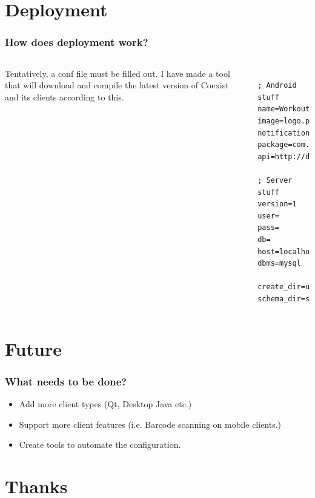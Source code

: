 \documentclass[]{beamer}
\begin{document}
\section{Deployment}

\begin{frame}[fragile]
\frametitle{How does deployment work?}

\begin{columns}[c]
\column{1.6in}
Tentatively, a conf file must be filled out. I have made a tool that will download and compile the latest version of Coexist and its clients according to this.
\column{2.5in}
\begin{lstlisting}

; Android stuff
name=Workoutlog
image=logo.png
notification=notification.png
package=com.domain
api=http://domain.com:/api/

; Server stuff
version=1
user=
pass=
db=
host=localhost
dbms=mysql

create_dir=ui 
schema_dir=sql

\end{lstlisting}

\end{columns}


\end{frame}




\section{Future}

\begin{frame}
\frametitle{What needs to be done?}

\begin{itemize}
\item Add more client types (Qt, Desktop Java etc.)
\item Support more client features (i.e. Barcode scanning on mobile clients.)
\item Create tools to automate the configuration.
\end{itemize}

\end{frame}


\section{Thanks}
\end{document}
